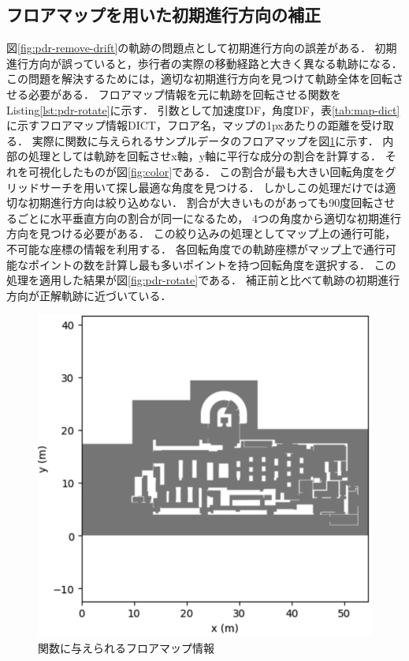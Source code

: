 


\subsection{フロアマップを用いた初期進行方向の補正}


図\ref{fig:pdr-remove-drift}の軌跡の問題点として初期進行方向の誤差がある．
初期進行方向が誤っていると，歩行者の実際の移動経路と大きく異なる軌跡になる．
この問題を解決するためには，適切な初期進行方向を見つけて軌跡全体を回転させる必要がある．
フロアマップ情報を元に軌跡を回転させる関数をListing\ref{lst:pdr-rotate}に示す．
引数として加速度DF，角度DF，表\ref{tab:map-dict}に示すフロアマップ情報DICT，フロア名，マップの1pxあたりの距離を受け取る．
実際に関数に与えられるサンプルデータのフロアマップを図\ref{fig:floor-map}に示す．
内部の処理としては軌跡を回転させx軸，y軸に平行な成分の割合を計算する．
それを可視化したものが図\ref{fig:color}である．
この割合が最も大きい回転角度をグリッドサーチを用いて探し最適な角度を見つける．
しかしこの処理だけでは適切な初期進行方向は絞り込めない．
割合が大きいものがあっても90度回転させるごとに水平垂直方向の割合が同一になるため，
4つの角度から適切な初期進行方向を見つける必要がある．
この絞り込みの処理としてマップ上の通行可能，不可能な座標の情報を利用する．
各回転角度での軌跡座標がマップ上で通行可能なポイントの数を計算し最も多いポイントを持つ回転角度を選択する．
この処理を適用した結果が図\ref{fig:pdr-rotate}である．
補正前と比べて軌跡の初期進行方向が正解軌跡に近づいている．


\begin{figure}[ht]
	\centering
	\includegraphics[width=\linewidth]{image/floor-map.jpg}
  \caption{関数に与えられるフロアマップ情報} \label{fig:floor-map}
\end{figure}


